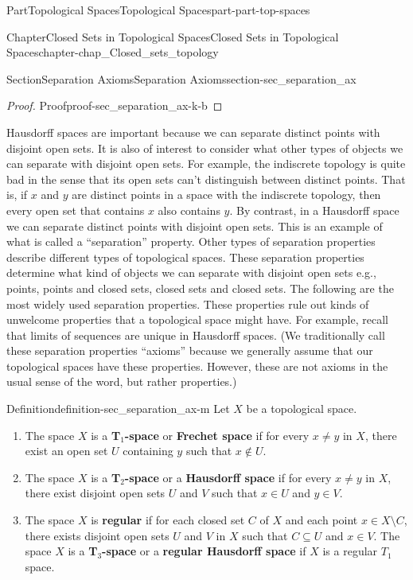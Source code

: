 \documentclass[oneside,10pt,]{book}
\newcommand{\terminology}[1]{\textbf{#1}}
\numberwithin{equation}{chapter}
\begin{document}
\begin{partptx}{Part}{Topological Spaces}{}{Topological Spaces}{}{}{part-part-top-spaces}
\begin{chapterptx}{Chapter}{Closed Sets in Topological Spaces}{}{Closed Sets in Topological Spaces}{}{}{chapter-chap_Closed_sets_topology}
\begin{sectionptx}{Section}{Separation Axioms}{}{Separation Axioms}{}{}{section-sec_separation_ax}
\begin{proof}{Proof}{}{proof-sec_separation_ax-k-b}
\end{proof}
Hausdorff spaces are important because we can separate distinct points with disjoint open sets. It is also of interest to consider what other types of objects we can separate with disjoint open sets. For example, the indiscrete topology is quite bad in the sense that its open sets can't distinguish between distinct points. That is, if \(x\) and \(y\) are distinct points in a space with the indiscrete topology, then every open set that contains \(x\) also contains \(y\). By contrast, in a Hausdorff space we can separate distinct points with disjoint open sets. This is an example of what is called a ``separation'' property. Other types of separation properties describe different types of topological spaces. These separation properties determine what kind of objects we can separate with disjoint open sets \textemdash{} e.g., points, points and closed sets, closed sets and closed sets. The following are the most widely used separation properties. These properties rule out kinds of unwelcome properties that a topological space might have. For example, recall that limits of sequences are unique in Hausdorff spaces. (We traditionally call these separation properties ``axioms'' because we generally assume that our topological spaces have these properties. However, these are not axioms in the usual sense of the word, but rather properties.)%
\begin{definition}{Definition}{}{definition-sec_separation_ax-m}%
%
%
%
%
%
%
Let \(X\) be a topological space.%
\begin{enumerate}
\item{}The space \(X\) is a \terminology{\terminology{T}\(_1\)-space} or \terminology{Frechet space} if for every \(x\neq y\) in \(X\), there exist an open set \(U\) containing \(y\) such that \(x \notin U\).%
\item{}The space \(X\) is a \terminology{\terminology{T}\(_2\)-space} or a \terminology{Hausdorff space} if for every \(x\neq y\) in \(X\), there exist disjoint open sets \(U\) and \(V\) such that \(x\in U\) and \(y\in V\).%
\item{}The space \(X\) is \terminology{regular} if for each closed set \(C\) of \(X\) and each point \(x \in X \setminus C\), there exists disjoint open sets \(U\) and \(V\) in \(X\) such that \(C \subseteq U\) and \(x \in V\). The space \(X\) is a \terminology{\terminology{T}\(_3\)-space} or a \terminology{regular Hausdorff space} if \(X\) is a regular \(T_1\) space.%

\end{enumerate}
\end{definition}
\end{sectionptx}
\end{chapterptx}
\end{partptx}
\end{document}
